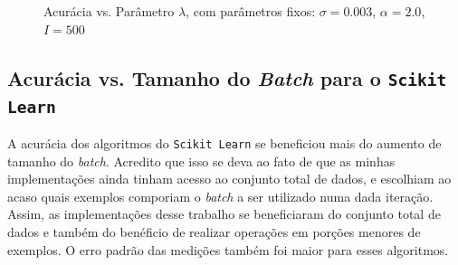 \documentclass[a4paper, 12pt]{article}
\begin{document}
\begin{figure}[htpb]
\begin{subfigure}[htpb]{0.45\textwidth}
        \caption{}
        \label{fig:lambda_logregL2}
    \end{subfigure}
    \caption{Acurácia vs. Parâmetro $\lambda$, com parâmetros fixos:
    $\sigma=0.003$, $\alpha=2.0$, $I=500$}\label{fig:lambda}
\end{figure}

\newpage
\subsection{Acurácia vs. Tamanho do \textit{Batch} para o \texttt{Scikit Learn}} \label{sec:acc_vs_batchSKL}

A acurácia dos algoritmos do \texttt{Scikit Learn} se beneficiou mais do
aumento de tamanho do \textit{batch}. Acredito que isso se deva ao fato de que
as minhas implementações ainda tinham acesso ao conjunto total de dados, e
escolhiam ao acaso quais exemplos comporiam o \textit{batch} a ser utilizado
numa dada iteração. Assim, as implementações desse trabalho se beneficiaram do
conjunto total de dados e também do benéficio de realizar operações em porções
menores de exemplos. O erro padrão das medições também foi maior para esses
algoritmos.
\end{document}
